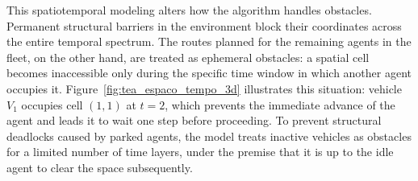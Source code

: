 This spatiotemporal modeling alters how the algorithm handles obstacles. Permanent structural barriers in the environment block their coordinates across the entire temporal spectrum. The routes planned for the remaining agents in the fleet, on the other hand, are treated as ephemeral obstacles: a spatial cell becomes inaccessible only during the specific time window in which another agent occupies it. Figure~\ref{fig:tea_espaco_tempo_3d} illustrates this situation: vehicle $V_1$ occupies cell $(1,1)$ at $t=2$, which prevents the immediate advance of the agent and leads it to wait one step before proceeding. To prevent structural deadlocks caused by parked agents, the model treats inactive vehicles as obstacles for a limited number of time layers, under the premise that it is up to the idle agent to clear the space subsequently.
 
